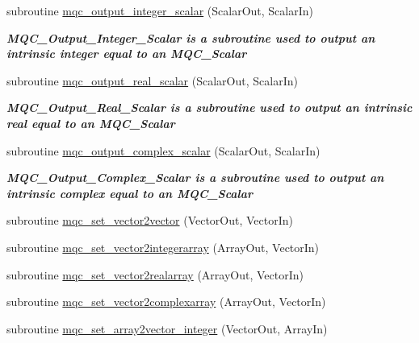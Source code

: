 \begin{DoxyCompactItemize}
subroutine \mbox{\hyperlink{interfacemqc__algebra_1_1assignment_07_0A_08_a3ea0c48bf4c74f2fafd1aee2bf4f1df1}{mqc\+\_\+output\+\_\+integer\+\_\+scalar}} (Scalar\+Out, Scalar\+In)
\begin{DoxyCompactList}\small\item\em {\bfseries{ M\+Q\+C\+\_\+\+Output\+\_\+\+Integer\+\_\+\+Scalar is a subroutine used to output an intrinsic integer equal to an M\+Q\+C\+\_\+\+Scalar}} \end{DoxyCompactList}\item 
subroutine \mbox{\hyperlink{interfacemqc__algebra_1_1assignment_07_0A_08_a0ab5384afc91fe63387fdd9baa8eca5a}{mqc\+\_\+output\+\_\+real\+\_\+scalar}} (Scalar\+Out, Scalar\+In)
\begin{DoxyCompactList}\small\item\em {\bfseries{ M\+Q\+C\+\_\+\+Output\+\_\+\+Real\+\_\+\+Scalar is a subroutine used to output an intrinsic real equal to an M\+Q\+C\+\_\+\+Scalar}} \end{DoxyCompactList}\item 
subroutine \mbox{\hyperlink{interfacemqc__algebra_1_1assignment_07_0A_08_a3b39720ba5ba39000e84c2c15759254c}{mqc\+\_\+output\+\_\+complex\+\_\+scalar}} (Scalar\+Out, Scalar\+In)
\begin{DoxyCompactList}\small\item\em {\bfseries{ M\+Q\+C\+\_\+\+Output\+\_\+\+Complex\+\_\+\+Scalar is a subroutine used to output an intrinsic complex equal to an M\+Q\+C\+\_\+\+Scalar}} \end{DoxyCompactList}\item 
subroutine \mbox{\hyperlink{interfacemqc__algebra_1_1assignment_07_0A_08_a7b6d597ccd93a1c1f82aa261ff2dffde}{mqc\+\_\+set\+\_\+vector2vector}} (Vector\+Out, Vector\+In)
\item 
subroutine \mbox{\hyperlink{interfacemqc__algebra_1_1assignment_07_0A_08_af60e7fa480d0caad0efda1ad9eabd866}{mqc\+\_\+set\+\_\+vector2integerarray}} (Array\+Out, Vector\+In)
\item 
subroutine \mbox{\hyperlink{interfacemqc__algebra_1_1assignment_07_0A_08_a316e66a9543345cd98c8cf7ec883d9a9}{mqc\+\_\+set\+\_\+vector2realarray}} (Array\+Out, Vector\+In)
\item 
subroutine \mbox{\hyperlink{interfacemqc__algebra_1_1assignment_07_0A_08_ae58b010eaac26b048c8ffb0f04aa7cfb}{mqc\+\_\+set\+\_\+vector2complexarray}} (Array\+Out, Vector\+In)
\item 
subroutine \mbox{\hyperlink{interfacemqc__algebra_1_1assignment_07_0A_08_abb0fd860cfa6a9d9746dc1839d178a78}{mqc\+\_\+set\+\_\+array2vector\+\_\+integer}} (Vector\+Out, Array\+In)

\end{DoxyCompactItemize}
